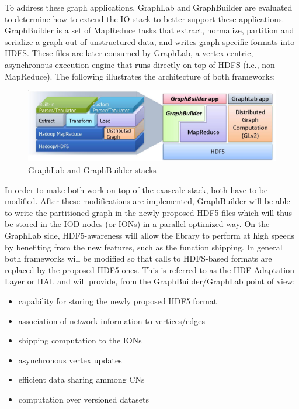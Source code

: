 \documentclass[conference]{IEEEtran}
\begin{document}
To address these graph applications, GraphLab and GraphBuilder are evaluated
to determine how to extend the IO stack to better support these applications.
GraphBuilder is a set of MapReduce tasks that extract, normalize, partition and
serialize a graph out of unstructured data, and writes graph-specific formats
into HDFS. These files are later consumed by GraphLab, a vertex-centric,
asynchronous execution engine that runs directly on top of HDFS (i.e.,
non-MapReduce). The following illustrates the architecture of both frameworks:

\begin{figure}[htbp]
\centering
\includegraphics[width=\columnwidth]{images/graphlab-and-graphbuilder.png}
\caption{GraphLab and GraphBuilder stacks}
\label{fig:graphlab-graphbuilder}
\end{figure}

In order to make both work on top of the exascale stack, both have to be
modified. After these modifications are implemented, GraphBuilder will
be able to write the partitioned graph in the newly proposed HDF5
files which will thus be stored in the IOD nodes (or IONs) in a
parallel-optimized way. On the GraphLab side, HDF5-awareness will allow
the library to perform at high speeds by benefiting from the new
features, such as the function shipping. In general both frameworks will be
modified so that calls to HDFS-based formats are replaced by the proposed HDF5
ones. This is referred to as the HDF Adaptation Layer or HAL and will
provide, from the GraphBuilder/GraphLab point of view:

\begin{itemize}
\itemsep1pt\parskip0pt
\item
  capability for storing the newly proposed HDF5 format
\item
  association of network information to vertices/edges
\item
  shipping computation to the IONs
\item
  asynchronous vertex updates
\item
  efficient data sharing ammong CNs
\item
  computation over versioned datasets
\end{itemize}
\end{document}
